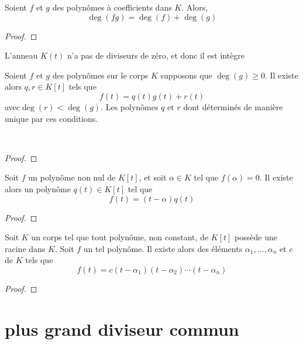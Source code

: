     \begin{theoreme}
        Soient $f$ et $g$ des polynômes à coefficients dans $K$. Alors,
        \[
        \operatorname{deg}(fg)=\operatorname{deg}(f)+\operatorname{deg}(g)
        \]
    \end{theoreme}

\begin{proof}
    
\end{proof}

\begin{corollaire}
    L'anneau $K(t)$ n'a pas de diviseurs de zéro, et donc il est intègre
\end{corollaire}

    \begin{theoreme}
        Soient $f$ et $g$ des polynômes sur le corps $K$
        supposons que $\operatorname{deg}(g)\geq 0$. Il existe alors $q,r\in K[t]$ tels que
        \[
        f(t)=q(t)g(t)+r(t)
        \]
        avec$\operatorname{deg}(r)<\operatorname{deg}(g)$. Les polynômes $q$ et $r$ dont déterminés de manière unique par ces conditions.
    \end{theoreme}
\
\begin{proof}
\end{proof}

    \begin{corollaire}
        Soit $f$ un polynôme non nul de $K[t]$, et soit $\alpha\in K$ tel que $f(\alpha)=0$. Il existe alors un polynôme $q(t)\in K[t]$ tel que
        \[
        f(t)=(t-\alpha)q(t)
        \]
    \end{corollaire}

\begin{proof}
\end{proof}

    \begin{corollaire}
        Soit $K$ un corps tel que tout polynôme, non constant, de $K[t]$ possède une racine dans $K$. Soit $f$ un tel polynôme. Il existe alors des éléments $\alpha_1,...,\alpha_n$ et $c$ de $K$ tels que
        \[
        f(t)=c(t-\alpha_1)(t-\alpha_2)\cdots(t-\alpha_n)
        \]
    \end{corollaire}
    \begin{proof}
    \end{proof}
\section{plus grand diviseur commun}

